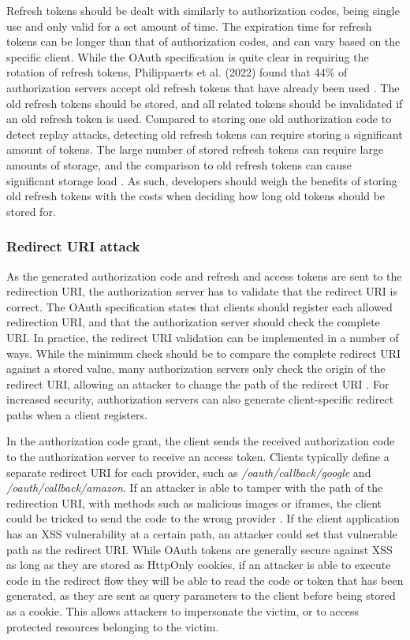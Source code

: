 Refresh tokens should be dealt with similarly to authorization codes, being single use and only valid for a set amount of time.
The expiration time for refresh tokens can be longer than that of authorization codes, and can vary based on the specific client.
While the OAuth specification is quite clear in requiring the rotation of refresh tokens, Philippaerts et al. (2022) found that 44\% of authorization servers accept old refresh tokens that have already been used
\citep{philippaerts_oauch_2022}.
The old refresh tokens should be stored, and all related tokens should be invalidated if an old refresh token is used.
Compared to storing one old authorization code to detect replay attacks, detecting old refresh tokens can require storing a significant amount of tokens.
The large number of stored refresh tokens can require large amounts of storage, and the comparison to old refresh tokens can cause significant storage load \citep{darwish_evaluation_2015}.
As such, developers should weigh the benefits of storing old refresh tokens with the costs when deciding how long old tokens should be stored for.

\subsubsection{Redirect URI attack}
As the generated authorization code and refresh and access tokens are sent to the redirection URI, the authorization server has to validate that the redirect URI is correct.
The OAuth specification states that clients should register each allowed redirection URI, and that the authorization server should check the complete URI.
In practice, the redirect URI validation can be implemented in a number of ways.
While the minimum check should be to compare the complete redirect URI against a stored value, many authorization servers only check the origin of the redirect URI, allowing an attacker to change the path of the redirect URI \citep{matyas_your_2018}.
For increased security, authorization servers can also generate client-specific redirect paths when a client registers.

In the authorization code grant, the client sends the received authorization code to the authorization server to receive an access token.
Clients typically define a separate redirect URI for each provider, such as \textit{/oauth/callback/google} and \textit{/oauth/callback/amazon}.
If an attacker is able to tamper with the path of the redirection URI, with methods such as malicious images or iframes, the client could be tricked to send the code to the wrong provider \citep{matyas_your_2018}.
If the client application has an XSS vulnerability at a certain path, an attacker could set that vulnerable path as the redirect URI.
While OAuth tokens are generally secure against XSS as long as they are stored as HttpOnly cookies, if an attacker is able to execute code in the redirect flow they will be able to read the code or token that has been generated, as they are sent as query parameters to the client before being stored as a cookie.
This allows attackers to impersonate the victim, or to access protected resources belonging to the victim.


